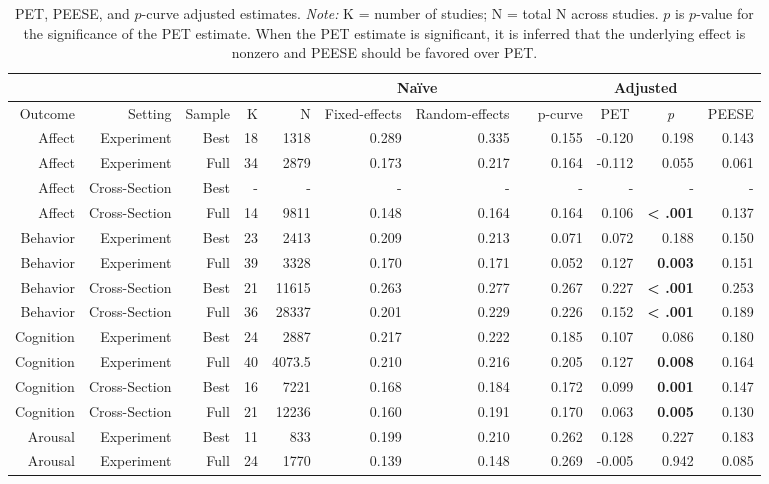 \documentclass[man]{apa6}
\begin{document}
\begin{table}
	\centering
	\caption{PET, PEESE, and $p$-curve adjusted estimates. {\em Note:} K = number of studies; N = total N across studies. $p$ is $p$-value for the significance of the PET estimate. When the PET estimate is significant, it is inferred that the underlying effect is nonzero and PEESE should be favored over PET.}
	\begin{tabular}{rrrrrrrrrrrr}
		\toprule
		&       &       &       &       & \multicolumn{2}{c}{Na{\"i}ve} & \multicolumn{1}{c}{} & \multicolumn{4}{c}{Adjusted} \\
		\midrule
		Outcome & Setting & Sample & K     & N     & \multicolumn{1}{c}{Fixed-effects} & \multicolumn{1}{c}{Random-effects} & \multicolumn{1}{c}{} & \multicolumn{1}{c}{p-curve} & \multicolumn{1}{c}{PET} & \multicolumn{1}{c}{\textit{p}} & \multicolumn{1}{c}{PEESE} \\
		Affect & Experiment & Best  & 18    & 1318  & 0.289 & 0.335 &       & 0.155 & -0.120 & 0.198 & 0.143 \\
		Affect & Experiment & Full  & 34    & 2879  & 0.173 & 0.217 &       & 0.164 & -0.112 & 0.055 & 0.061 \\
		Affect & Cross-Section & Best  & -     & -     & -     & -     &       & -     & -     & -     & - \\
		Affect & Cross-Section & Full  & 14    & 9811  & 0.148 & 0.164 &       & 0.164 & 0.106 & \textbf{< .001} & 0.137 \\
		Behavior & Experiment & Best  & 23    & 2413  & 0.209 & 0.213 &       & 0.071 & 0.072 & 0.188 & 0.150 \\
		Behavior & Experiment & Full  & 39    & 3328  & 0.170 & 0.171 &       & 0.052 & 0.127 & \textbf{0.003} & 0.151 \\
		Behavior & Cross-Section & Best  & 21    & 11615 & 0.263 & 0.277 &       & 0.267 & 0.227 & \textbf{< .001} & 0.253 \\
		Behavior & Cross-Section & Full  & 36    & 28337 & 0.201 & 0.229 &       & 0.226 & 0.152 & \textbf{< .001} & 0.189 \\
		Cognition & Experiment & Best  & 24    & 2887  & 0.217 & 0.222 &       & 0.185 & 0.107 & 0.086 & 0.180 \\
		Cognition & Experiment & Full  & 40    & 4073.5 & 0.210 & 0.216 &       & 0.205 & 0.127 & \textbf{0.008} & 0.164 \\
		Cognition & Cross-Section & Best  & 16    & 7221  & 0.168 & 0.184 &       & 0.172 & 0.099 & \textbf{0.001} & 0.147 \\
		Cognition & Cross-Section & Full  & 21    & 12236 & 0.160 & 0.191 &       & 0.170 & 0.063 & \textbf{0.005} & 0.130 \\
		Arousal & Experiment & Best  & 11    & 833   & 0.199 & 0.210 &       & 0.262 & 0.128 & 0.227 & 0.183 \\
		Arousal & Experiment & Full  & 24    & 1770  & 0.139 & 0.148 &       & 0.269 & -0.005 & 0.942 & 0.085 \\
		\bottomrule
	\end{tabular}%
	\label{table:adjustment}%
\end{table}
\end{document}
